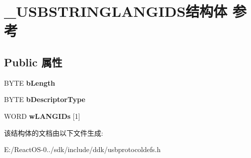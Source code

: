 \hypertarget{struct___u_s_b_s_t_r_i_n_g_l_a_n_g_i_d_s}{}\section{\+\_\+\+U\+S\+B\+S\+T\+R\+I\+N\+G\+L\+A\+N\+G\+I\+D\+S结构体 参考}
\label{struct___u_s_b_s_t_r_i_n_g_l_a_n_g_i_d_s}
\subsection*{Public 属性}
\begin{DoxyCompactItemize}
\item 
\mbox{\label{struct___u_s_b_s_t_r_i_n_g_l_a_n_g_i_d_s_a63d40f7bc834a5c3c834fa670cfef0cf}} 
B\+Y\+TE {\bfseries b\+Length}
\item 
\mbox{\label{struct___u_s_b_s_t_r_i_n_g_l_a_n_g_i_d_s_a3bb714babc7652d880540b6e2dfd76cc}} 
B\+Y\+TE {\bfseries b\+Descriptor\+Type}
\item 
\mbox{\label{struct___u_s_b_s_t_r_i_n_g_l_a_n_g_i_d_s_a2776194b05f0fb2e2df79cc561345c5c}} 
W\+O\+RD {\bfseries w\+L\+A\+N\+G\+I\+Ds} \mbox{[}1\mbox{]}
\end{DoxyCompactItemize}


该结构体的文档由以下文件生成\+:\begin{DoxyCompactItemize}
\item 
E\+:/\+React\+O\+S-\/0../sdk/include/ddk/usbprotocoldefs.\+h\end{DoxyCompactItemize}
